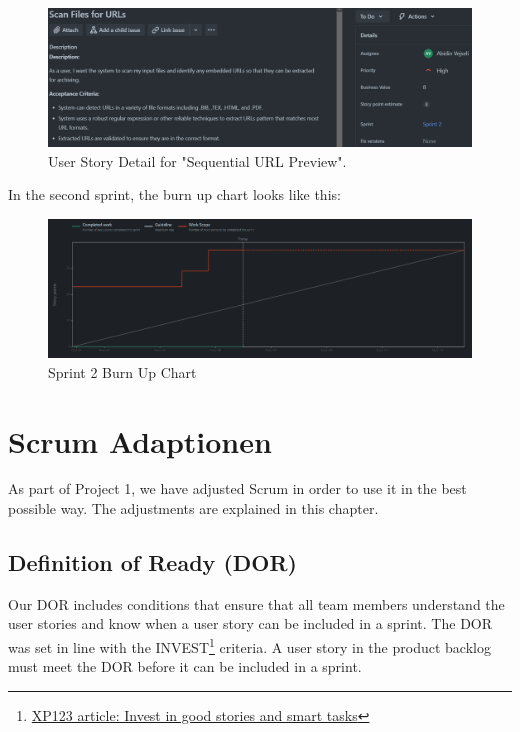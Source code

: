 \begin{figure}[h!]
    \centering
    \includegraphics[width=1\textwidth]{pictures/sprint_2_userstory_4}
    \caption{User Story Detail for "Sequential URL Preview".}
    \label{fig:sprint_2_userstory_4}
\end{figure}
\clearpage

In the second sprint, the burn up chart looks like this:
\begin{figure}[h!]
    \centering
    \includegraphics[width=1\textwidth]{pictures/sprint_2_burndownchart}
    \caption{Sprint 2 Burn Up Chart}
    \label{fig:sprint_2_bunrdown_chart}
\end{figure}
\clearpage


\section{Scrum Adaptionen}
As part of Project 1, we have adjusted Scrum in order to use it in the best possible way. The adjustments are explained in this chapter.

\subsection{Definition of Ready (DOR)}
Our DOR includes conditions that ensure that all team members understand the user stories and know when a user story can be included in a sprint. The DOR was set in line with the INVEST\footnote{\href{https://xp123.com/articles/invest-in-good-stories-and-smart-tasks/}{XP123 article: Invest in good stories and smart tasks}} criteria. A user story in the product backlog must meet the DOR before it can be included in a sprint.

